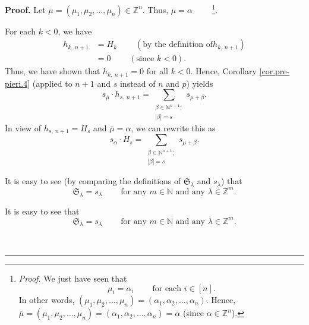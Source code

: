 \documentclass
[numbers=enddot,12pt,final,onecolumn,notitlepage,english]{scrartcl}%
\theoremstyle{definition}
\newenvironment{proof}[1][Proof]{\noindent\textbf{#1.} }{\ \rule{0.5em}{0.5em}}
\let\sumnonlimits\sum
\renewcommand{\sum}{\sumnonlimits\limits}
\newenvironment{verlong}{}{}
\newenvironment{vershort}{}{}
\begin{document}
\begin{proof}
\begin{verlong}
Let $\overline{\mu}=\left(  \mu_{1},\mu_{2},\ldots,\mu_{n}\right)
\in\mathbb{Z}^{n}$. Thus, $\overline{\mu}=\alpha$%
\ \ \ \ \footnote{\textit{Proof.} We just have seen that%
\[
\mu_{i}=\alpha_{i}\ \ \ \ \ \ \ \ \ \ \text{for each }i\in\left[  n\right]  .
\]
In other words, $\left(  \mu_{1},\mu_{2},\ldots,\mu_{n}\right)  =\left(
\alpha_{1},\alpha_{2},\ldots,\alpha_{n}\right)  $. Hence, $\overline{\mu
}=\left(  \mu_{1},\mu_{2},\ldots,\mu_{n}\right)  =\left(  \alpha_{1}%
,\alpha_{2},\ldots,\alpha_{n}\right)  =\alpha$ (since $\alpha\in\mathbb{Z}%
^{n}$).}.
\end{verlong}

For each $k<0$, we have
\begin{align*}
h_{k,\ n+1}  &  =H_{k}\ \ \ \ \ \ \ \ \ \ \left(  \text{by the definition of
}h_{k,\ n+1}\right) \\
&  =0\ \ \ \ \ \ \ \ \ \ \left(  \text{since }k<0\right)  .
\end{align*}
Thus, we have shown that $h_{k,\ n+1}=0$ for all $k<0$. Hence, Corollary
\ref{cor.pre-pieri.4} (applied to $n+1$ and $s$ instead of $n$ and $p$) yields%
\[
s_{\overline{\mu}}\cdot h_{s,\ n+1}=\sum_{\substack{\beta\in\mathbb{N}%
^{n+1};\\\left\vert \beta\right\vert =s}}s_{\mu+\beta}.
\]
In view of $h_{s,\ n+1}=H_{s}$ and $\overline{\mu}=\alpha$, we can rewrite
this as%
\begin{equation}
s_{\alpha}\cdot H_{s}=\sum_{\substack{\beta\in\mathbb{N}^{n+1};\\\left\vert
\beta\right\vert =s}}s_{\mu+\beta}. \label{pf.prop.immac.1}%
\end{equation}


\begin{vershort}
It is easy to see (by comparing the definitions of $\mathfrak{S}_{\lambda}$
and $s_{\lambda}$) that%
\begin{equation}
\mathfrak{S}_{\lambda}=s_{\lambda}\ \ \ \ \ \ \ \ \ \ \text{for any }%
m\in\mathbb{N}\text{ and any }\lambda\in\mathbb{Z}^{m}.
\label{pf.prop.immac.short.S=s}%
\end{equation}

\end{vershort}

\begin{verlong}
It is easy to see that%
\begin{equation}
\mathfrak{S}_{\lambda}=s_{\lambda}\ \ \ \ \ \ \ \ \ \ \text{for any }%
m\in\mathbb{N}\text{ and any }\lambda\in\mathbb{Z}^{m}.
\label{pf.prop.immac.S=s}%
\end{equation}



\end{verlong}
\end{proof}
\end{document}
